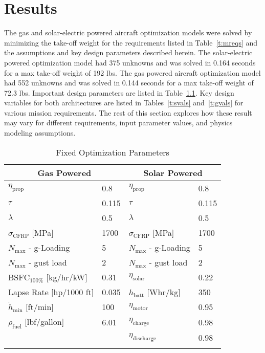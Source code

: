 
\chapter{Results}

The gas and solar-electric powered aircraft optimization models were solved by minimizing the take-off weight for the requirements listed in Table~\ref{t:mreqs} and the assumptions and key design parameters described herein. 
The solar-electric powered optimization model had 375 unknowns and was solved in 0.164 seconds for a max take-off weight of 192 lbs.
The gas powered aircraft optimization model had 552 unknowns and was solved in 0.144 seconds for a max take-off weight of 72.3 lbs.  
Important design parameters are listed in Table~\ref{t:gassolarparams}.
Key design variables for both architectures are listed in Tables~\ref{t:svals} and~\ref{t:gvals} for various mission requirements. 
The rest of this section explores how these result may vary for different requirements, input parameter values, and physics modeling assumptions. 

\footnotesize
\begin{longtable}{llll}
\caption{Fixed Optimization Parameters} \\
\toprule
\toprule
\multicolumn{2}{c}{Gas Powered} & \multicolumn{2}{c}{Solar Powered}\\
\midrule
$\eta_{\text{prop}}$         & 0.8  & $\eta_{\text{prop}}$         & 0.8 \\
$\tau$                       & 0.115 & $\tau$                       & 0.115 \\
$\lambda$                    & 0.5  & $\lambda$                    & 0.5 \\
$\sigma_{\text{CFRP}}$ [MPa] & 1700 & $\sigma_{\text{CFRP}}$ [MPa] & 1700  \\
$N_{\text{max}}$ - g-Loading & 5    & $N_{\text{max}}$ - g-Loading & 5 \\
$N_{\text{max}}$ - gust load & 2    & $N_{\text{max}}$ - gust load & 2 \\
$\text{BSFC}_{100\%}$ [kg/hr/kW] & 0.31 & $\eta_{\text{solar}}$      & 0.22 \\
Lapse Rate [hp/1000 ft]      & 0.035 &  $h_{\text{batt}}$ [Whr/kg]   & 350 \\
$\dot{h}_{\text{min}}$ [ft/min] & 100 & $\eta_{\text{motor}}$           & 0.95 \\ 
$\rho_{\text{fuel}} $ [lbf/gallon] & 6.01 & $\eta_{\text{charge}}$          & 0.98 \\
                             &     & $\eta_{\text{discharge}}$       & 0.98 \\
\bottomrule
\label{t:gassolarparams}
 \end{longtable}

